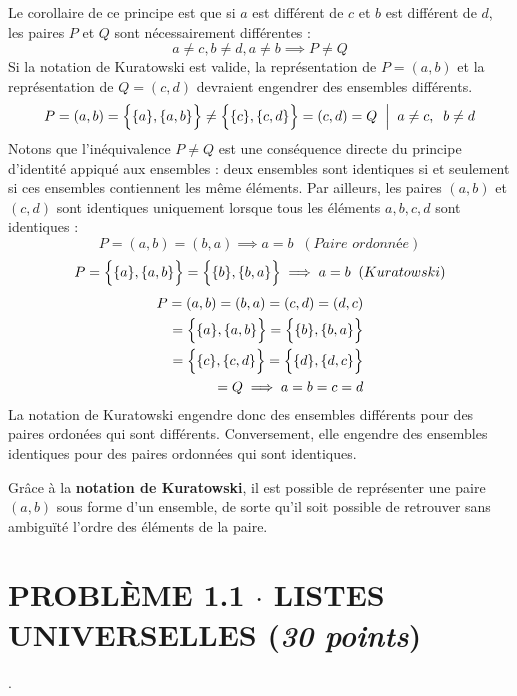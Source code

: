 \documentclass[8pt]{report}
\begin{document}
    Le corollaire de ce principe est que si $a$ est différent de $c$ et $b$ est différent de $d$, les paires 
    $P$ et $Q$ sont nécessairement différentes : 
    \[ a \neq c, b \neq d, a \neq b \implies P \neq Q   \]
    Si la notation de Kuratowski est valide, la représentation 
    de $P = (a, b)$ et la représentation de $Q = (c, d)$ devraient engendrer des ensembles différents. 
    \[  P = (a, b) = \Bigl\{ \{ a \}, \{a, b \}  \Bigr\} \neq \Bigl\{ \{ c \}, \{c, d \}  \Bigr\} = (c, d) = Q\;\; 
    \Big| \;\; a \neq c, \;\; b \neq d  \]
    Notons que l'inéquivalence $P \neq Q$ est une conséquence directe du principe d'identité appiqué aux ensembles : 
    deux ensembles sont identiques si et seulement si ces ensembles contiennent les même éléments. Par ailleurs,
    les paires $(a, b)$ et $(c, d)$ sont identiques uniquement lorsque tous les éléments $a, b, c, d$ sont identiques : 
    \[ P = (a, b) = (b, a) \implies a = b \;\; (\textit{Paire ordonnée}  )  \] 
    \[ P =  \Bigl\{ \{ a \}, \{a, b \}\Bigr\} =  \Bigl\{ \{ b\}, \{b, a \}\Bigr\} \implies a = b \;\; (Kuratowski) \]
    \begin{align*}
         P = (a, b) = (b, a) = (c, d) = (d, c) \\
         = \Bigl\{ \{ a \}, \{a, b \}\Bigr\} =  \Bigl\{ \{ b\}, \{b, a \}\Bigr\} \\
         = \Bigl\{ \{ c \}, \{c, d \}\Bigr\} =  \Bigl\{ \{ d\}, \{d, c \}\Bigr\}  \\
         = Q \implies a = b = c = d        
    \end{align*}
    La notation de  
    Kuratowski engendre donc des ensembles différents pour des paires ordonées qui sont différents. Conversement, 
    elle engendre des ensembles identiques pour des paires ordonnées qui sont identiques. 
    \begin{Reponse}{}{}
        Grâce à la \textbf{notation de Kuratowski}, 
        il est possible de représenter une paire $(a,b)$ sous forme d'un ensemble,
        de sorte qu’il soit possible de retrouver sans ambiguïté l’ordre des éléments de la paire. 
    \end{Reponse}




\section*{\textnormal{PROBLÈME 1.1 \;\;\;\; $\cdot$ \;\;\;\; LISTES UNIVERSELLES \hspace*{\fill} (\textit{30 points})}}. 
\end{document}
